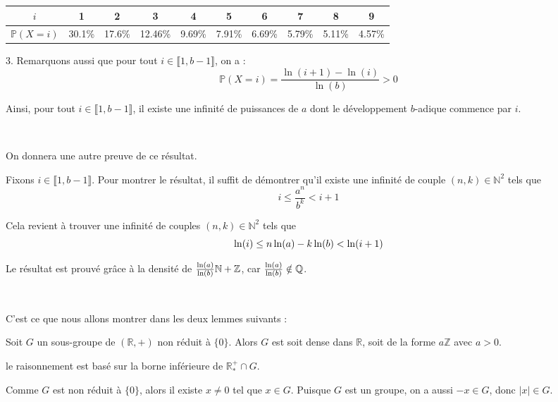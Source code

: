 \begin{center}
  \begin{tabular}{|c|c|c|c|c|c|c|c|c|c|}
    \hline
    $i$ & 1 & 2 & 3 & 4 & 5 & 6 & 7 & 8 & 9\\
    \hline
    $\mathbb{P} (X = i)$ & 30.1\% & 17.6\% & 12.46\% & 9.69\% & 7.91\% &
    6.69\% & 5.79\% & 5.11\% & 4.57\%\\
    \hline
  \end{tabular}
\end{center}



3. Remarquons aussi que pour tout $i \in \llbracket 1, b - 1 \rrbracket$, on
a :
\[ \mathbb{P} (X = i) = \frac{\ln (i + 1) - \ln (i)}{\ln (b)} > 0 \]


Ainsi, pour tout $i \in \llbracket 1, b - 1 \rrbracket$, il existe une
infinit{\'e} de puissances de $a$ dont le d{\'e}veloppement $b$-adique
commence par $i$.

\

On donnera une autre preuve de ce r{\'e}sultat.

Fixons $i \in \llbracket 1, b - 1 \rrbracket$. Pour montrer le r{\'e}sultat,
il suffit de d{\'e}montrer qu'il existe une infinit{\'e} de couple $(n, k) \in
\mathbb{N}^2$ tels que
\[ i \leq \frac{a^n}{b^k} < i + 1 \]


Cela revient {\`a} trouver une infinit{\'e} de couples $(n, k) \in
\mathbb{N}^2$ tels que
\[ \ln  (i) \leq n \ln  (a) - k \ln  (b) < \ln
    (i + 1) \]


Le r{\'e}sultat est prouv{\'e} gr{\^a}ce {\`a} la densit{\'e} de $\frac{\ln
 (a)}{\ln  (b)} \mathbb{N}+\mathbb{Z}$, car $\frac{\ln
 (a)}{\ln  (b)} \notin \mathbb{Q}$.

\

C'est ce que nous allons montrer dans les deux lemmes suivants :


Soit $G$ un sous-groupe de $(\mathbb{R}, +)$ non r{\'e}duit {\`a} $\{0\}$.
Alors $G$ est soit dense dans $\mathbb{R}$, soit de la forme $a\mathbb{Z}$
avec $a > 0$.


le raisonnement est bas{\'e} sur la borne inf{\'e}rieure de
$\mathbb{R}^+_{\ast} \cap G$.

Comme $G$ est non r{\'e}duit {\`a} $\{0\}$, alors il existe $x \neq 0$ tel que
$x \in G$. Puisque $G$ est un groupe, on a aussi $- x \in G$, donc $|x| \in
G$.

